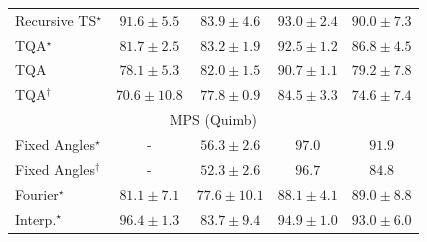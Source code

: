 \begin{tabular}{l|cccc|}
Recursive TS$^\star$ & {\cellcolor[HTML]{810F7C}} \color[HTML]{F1F1F1} $91.6\pm 5.5$ & {\cellcolor[HTML]{8A51A5}} \color[HTML]{F1F1F1} $83.9\pm 4.6$ & {\cellcolor[HTML]{740B70}} \color[HTML]{F1F1F1} $93.0\pm 2.4$ & {\cellcolor[HTML]{831F86}} \color[HTML]{F1F1F1} $90.0\pm 7.3$ \\
TQA$^\star$ & {\cellcolor[HTML]{8B62AD}} \color[HTML]{F1F1F1} $81.7\pm 2.5$ & {\cellcolor[HTML]{8A56A7}} \color[HTML]{F1F1F1} $83.2\pm 1.9$ & {\cellcolor[HTML]{790D75}} \color[HTML]{F1F1F1} $92.5\pm 1.2$ & {\cellcolor[HTML]{873B99}} \color[HTML]{F1F1F1} $86.8\pm 4.5$ \\
TQA & {\cellcolor[HTML]{8C7DBA}} \color[HTML]{F1F1F1} $78.1\pm 5.3$ & {\cellcolor[HTML]{8B60AC}} \color[HTML]{F1F1F1} $82.0\pm 1.5$ & {\cellcolor[HTML]{821982}} \color[HTML]{F1F1F1} $90.7\pm 1.1$ & {\cellcolor[HTML]{8C75B6}} \color[HTML]{F1F1F1} $79.2\pm 7.8$ \\
TQA$^\dagger$ & {\cellcolor[HTML]{9AB3D5}} \color[HTML]{000000} $70.6\pm 10.8$ & {\cellcolor[HTML]{8C80BB}} \color[HTML]{F1F1F1} $77.8\pm 0.9$ & {\cellcolor[HTML]{894DA3}} \color[HTML]{F1F1F1} $84.5\pm 3.3$ & {\cellcolor[HTML]{8D98C7}} \color[HTML]{F1F1F1} $74.6\pm 7.4$ \\
\cline{1-5}
\multicolumn{5}{c}{\rule{0pt}{8pt}MPS (Quimb)} \\
\midrule
Fixed Angles$^\star$ & {\cellcolor[HTML]{000000}} \color[HTML]{F1F1F1} {\cellcolor{white}} \color{black} - & {\cellcolor[HTML]{FFF9C9}} \color[HTML]{000000} $56.3\pm 2.6$ & {\cellcolor[HTML]{692606}} \color[HTML]{F1F1F1} $97.0$ & {\cellcolor[HTML]{983404}} \color[HTML]{F1F1F1} $91.9$ \\
Fixed Angles$^\dagger$ & {\cellcolor[HTML]{000000}} \color[HTML]{F1F1F1} {\cellcolor{white}} \color{black} - & {\cellcolor[HTML]{FFFFE5}} \color[HTML]{000000} $52.3\pm 2.6$ & {\cellcolor[HTML]{6B2606}} \color[HTML]{F1F1F1} $96.7$ & {\cellcolor[HTML]{D35406}} \color[HTML]{F1F1F1} $84.8$ \\
Fourier$^\star$ & {\cellcolor[HTML]{E86C12}} \color[HTML]{F1F1F1} $81.1\pm 7.1$ & {\cellcolor[HTML]{F5851F}} \color[HTML]{F1F1F1} $77.6\pm 10.1$ & {\cellcolor[HTML]{B94303}} \color[HTML]{F1F1F1} $88.1\pm 4.1$ & {\cellcolor[HTML]{B13F03}} \color[HTML]{F1F1F1} $89.0\pm 8.8$ \\
Interp.$^\star$ & {\cellcolor[HTML]{6E2706}} \color[HTML]{F1F1F1} $96.4\pm 1.3$ & {\cellcolor[HTML]{D95B09}} \color[HTML]{F1F1F1} $83.7\pm 9.4$ & {\cellcolor[HTML]{7C2C05}} \color[HTML]{F1F1F1} $94.9\pm 1.0$ & {\cellcolor[HTML]{8C3004}} \color[HTML]{F1F1F1} $93.0\pm 6.0$ \\

\end{tabular}
